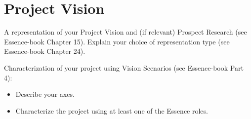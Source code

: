 \section{Project Vision}
A representation of your Project Vision and (if relevant) Prospect Research (see Essence-book Chapter 15).
Explain your choice of representation type (see Essence-book Chapter 24).

Characterization of your project using Vision Scenarios  (see Essence-book Part 4):
\begin{itemize}
\item Describe your axes.
\item Characterize the project using at least one of the Essence roles.
\end{itemize}